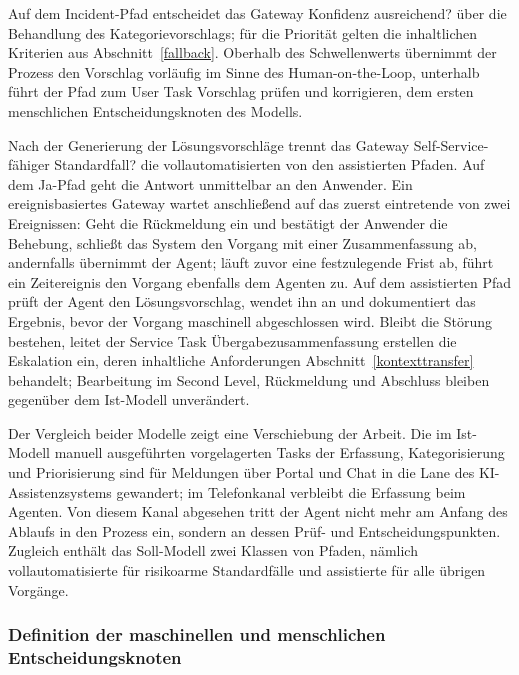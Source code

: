 Auf dem Incident-Pfad entscheidet das Gateway \glqq Konfidenz ausreichend?\grqq{} \"uber die Behandlung des Kategorievorschlags; f\"ur die Priorit\"at gelten die inhaltlichen Kriterien aus Abschnitt~\ref{fallback}. Oberhalb des Schwellenwerts \"ubernimmt der Prozess den Vorschlag vorl\"aufig im Sinne des Human-on-the-Loop, unterhalb f\"uhrt der Pfad zum User Task \glqq Vorschlag pr\"ufen und korrigieren\grqq{}, dem ersten menschlichen Entscheidungsknoten des Modells.

Nach der Generierung der L\"osungsvorschl\"age trennt das Gateway \glqq Self-Service-f\"ahiger Standardfall?\grqq{} die vollautomatisierten von den assistierten Pfaden. Auf dem Ja-Pfad geht die Antwort unmittelbar an den Anwender. Ein ereignisbasiertes Gateway wartet anschlie{\ss}end auf das zuerst eintretende von zwei Ereignissen: Geht die R\"uckmeldung ein und best\"atigt der Anwender die Behebung, schlie{\ss}t das System den Vorgang mit einer Zusammenfassung ab, andernfalls \"ubernimmt der Agent; l\"auft zuvor eine festzulegende Frist ab, f\"uhrt ein Zeitereignis den Vorgang ebenfalls dem Agenten zu. Auf dem assistierten Pfad pr\"uft der Agent den L\"osungsvorschlag, wendet ihn an und dokumentiert das Ergebnis, bevor der Vorgang maschinell abgeschlossen wird. Bleibt die St\"orung bestehen, leitet der Service Task \glqq \"Ubergabezusammenfassung erstellen\grqq{} die Eskalation ein, deren inhaltliche Anforderungen Abschnitt~\ref{kontexttransfer} behandelt; Bearbeitung im Second Level, R\"uckmeldung und Abschluss bleiben gegen\"uber dem Ist-Modell unver\"andert.

Der Vergleich beider Modelle zeigt eine Verschiebung der Arbeit. Die im Ist-Modell manuell ausgef\"uhrten vorgelagerten Tasks der Erfassung, Kategorisierung und Priorisierung sind f\"ur Meldungen \"uber Portal und Chat in die Lane des KI-Assistenzsystems gewandert; im Telefonkanal verbleibt die Erfassung beim Agenten. Von diesem Kanal abgesehen tritt der Agent nicht mehr am Anfang des Ablaufs in den Prozess ein, sondern an dessen Pr\"uf- und Entscheidungspunkten. Zugleich enth\"alt das Soll-Modell zwei Klassen von Pfaden, n\"amlich vollautomatisierte f\"ur risikoarme Standardf\"alle und assistierte f\"ur alle \"ubrigen Vorg\"ange.

\subsubsection{Definition der maschinellen und menschlichen Entscheidungsknoten}
\label{entscheidungsknoten}

